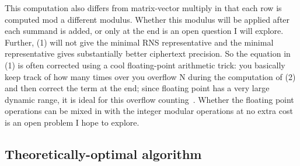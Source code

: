 This computation also differs from matrix-vector multiply in that each row is
computed mod a different modulus.
Whether this modulus will be applied after each summand is added, or only at
the end is an open question I will explore.
Further, (1) will not give the minimal RNS representative and the minimal
representative gives substantially better ciphertext precision\cite{bajard2017full}.
So the equation in (1) is often corrected using a cool floating-point
arithmetic trick: you basically keep track of how many times over you overflow
N during the computation of (2) and then correct the term at the end; since
floating point has a very large dynamic range, it is ideal for this overflow
counting~\cite{lattigo-github}.
Whether the floating point operations can be mixed in with the integer modular
operations at no extra cost is an open problem I hope to explore.


\subsection{Theoretically-optimal algorithm}

